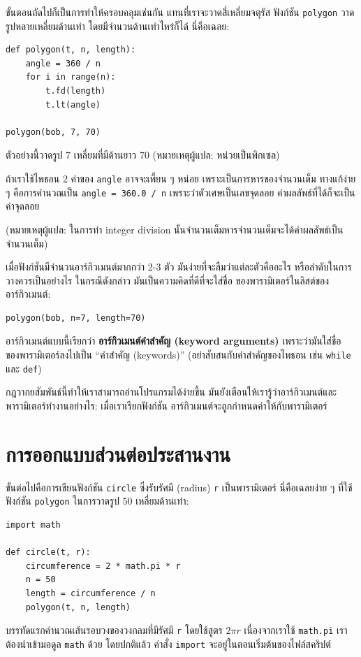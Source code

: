 ขั้นตอนถัดไปก็เป็นการทำให้ครอบคลุมเช่นกัน แทนที่เราจะวาดสี่เหลี่ยมจตุรัส  ฟังก์ชัน {\tt polygon} 
วาดรูปหลายเหลี่ยมด้านเท่า โดยมีจำนวนด้านเท่าไหร่ก็ได้ 
นี่คือเฉลย:

\begin{verbatim}
def polygon(t, n, length):
    angle = 360 / n
    for i in range(n):
        t.fd(length)
        t.lt(angle)

polygon(bob, 7, 70)
\end{verbatim}
%

ตัวอย่างนี้วาดรูป 7 เหลี่ยมที่มีด้านยาว 70 
(หมายเหตุผู้แปล: หน่วยเป็นพิกเซล)

ถ้าเราใช้ไพธอน 2 ค่าของ {\tt angle} อาจจะเพี้ยน ๆ หน่อย เพราะเป็นการหารของจำนวนเต็ม 
ทางแก้ง่าย ๆ คือการคำนวณเป็น {\tt angle = 360.0 / n} เพราะว่าตัวเศษเป็นเลขจุดลอย 
ค่าผลลัพธ์ที่ได้ก็จะเป็นค่าจุดลอย

(หมายเหตุผู้แปล: ในการทำ integer division นั้นจำนวนเต็มหารจำนวนเต็มจะได้ค่าผลลัพธ์เป็นจำนวนเต็ม)

เมื่อฟังก์ชันมีจำนวนอาร์กิวเมนต์มากกว่า 2-3 ตัว มันง่ายที่จะลืมว่าแต่ละตัวคืออะไร 
หรือลำดับในการวางควรเป็นอย่างไร  ในกรณีดังกล่าว มันเป็นความคิดที่ดีที่จะใส่ชื่อ
ของพารามิเตอร์ในลิสต์ของอาร์กิวเมนต์:

\begin{verbatim}
polygon(bob, n=7, length=70)
\end{verbatim}
%
อาร์กิวเมนต์แบบนี้เรียกว่า {\bf อาร์กิวเมนต์คำสำคัญ (keyword arguments)} เพราะว่ามันใส่ชื่อ
ของพารามิเตอร์ลงไปเป็น ``คำสำคัญ (keywords)'' (อย่าสับสนกับคำสำคัญของไพธอน เช่น 
{\tt while} และ {\tt def})

กฎวากยสัมพันธ์นี้ทำให้เราสามารถอ่านโปรแกรมได้ง่ายขึ้น มันยังเตือนให้เรารู้ว่าอาร์กิวเมนต์และ
พารามิเตอร์ทำงานอย่างไร: เมื่อเราเรียกฟังก์ชัน อาร์กิวเมนต์จะถูกกำหนดค่าให้กับพารามิเตอร์


\section{การออกแบบส่วนต่อประสานงาน} %

ขั้นต่อไปคือการเขียนฟังก์ชัน {\tt circle} ซึ่งรับรัศมี (radius) {\tt r} เป็นพารามิเตอร์
นี่คือเฉลยง่าย ๆ ที่ใช้ฟังก์ชัน {\tt polygon} ในการวาดรูป 50 เหลี่ยมด้านเท่า:

\begin{verbatim}
import math

def circle(t, r):
    circumference = 2 * math.pi * r
    n = 50
    length = circumference / n
    polygon(t, n, length)
\end{verbatim}
%
บรรทัดแรกคำนวณเส้นรอบวงของวงกลมที่มีรัศมี {\tt r} โดยใช้สูตร $2 \pi r$ เนื่องจากเราใช้ {\tt math.pi}
เราต้องนำเข้ามอดูล {\tt math} ด้วย โดยปกติแล้ว คำสั่ง {\tt import} จะอยู่ในตอนเริ่มต้นของไฟล์สคริปต์

